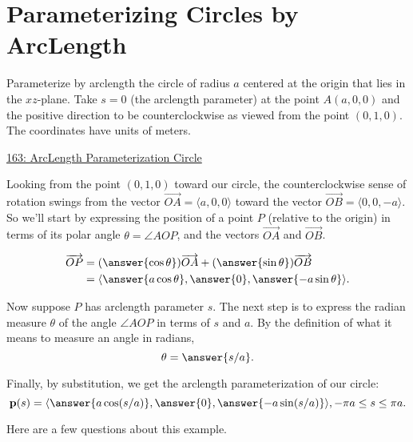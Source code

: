 \documentclass{ximera}
\begin{document}
\section{Parameterizing Circles by ArcLength}
\begin{question}  \label{Qewr9erergg}
Parameterize by arclength the circle of radius $a$ centered at the origin that lies in the $xz$-plane. Take $s=0$ (the arclength parameter) at the point $A(a,0,0)$ and the positive direction to be counterclockwise as viewed from the point $(0,1,0)$. The coordinates have units of meters.

\begin{onlineOnly}
    \begin{center}
\end{center}
\end{onlineOnly}

\href{https://www.desmos.com/3d/6uvzmng195}{163: ArcLength Parameterization Circle}



\begin{explanation}
Looking from the point $(0,1,0)$ toward our circle, the counterclockwise sense of rotation swings from the vector $\overrightarrow{OA} = \langle a, 0, 0\rangle$ toward the vector $\overrightarrow{OB} = \langle 0,0,-a \rangle$. So we'll start by expressing the position of a point $P$ (relative to the origin) in terms of its polar angle $\theta = \angle AOP$, and the vectors $\overrightarrow{OA}$ and $\overrightarrow{OB}$.  

\begin{align}
   \overrightarrow{OP} &= (\answer{\cos \theta}) \overrightarrow{OA} + (\answer{\sin\theta} )\overrightarrow{OB} \\
                                 &= \langle  \answer{a\cos\theta} , \answer{0}   ,  \answer{-a\sin\theta}   \rangle .
\end{align}


Now suppose $P$ has arclength parameter $s$. The next step is to express the radian measure $\theta$ of the angle $\angle AOP$ in terms of $s$ and $a$. By the definition of what it means to measure an angle in radians,
\[
    \theta = \answer{s/a} .
\]

Finally, by substitution, we get the arclength parameterization of our circle:
\[
   {\bf p}(s) = \langle  \answer{a\cos (s/a)} , \answer{0}   ,  \answer{-a\sin (s/a)}   \rangle , -\pi a \leq s \leq \pi a.
\]

Here are a few questions about this example.


\end{explanation}
\end{question}
\end{document}
